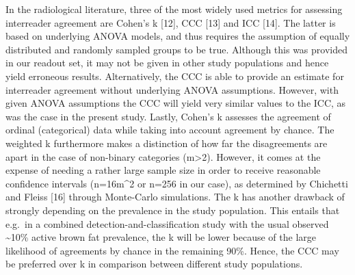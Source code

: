 \documentclass[]{elsarticle} %
\begin{document}
In the radiological literature, three of the most widely used metrics
for assessing interreader agreement are Cohen's k {[}12{]}, CCC {[}13{]}
and ICC {[}14{]}. The latter is based on underlying ANOVA models, and
thus requires the assumption of equally distributed and randomly sampled
groups to be true. Although this was provided in our readout set, it may
not be given in other study populations and hence yield erroneous
results. Alternatively, the CCC is able to provide an estimate for
interreader agreement without underlying ANOVA assumptions. However,
with given ANOVA assumptions the CCC will yield very similar values to
the ICC, as was the case in the present study. Lastly, Cohen's k
assesses the agreement of ordinal (categorical) data while taking into
account agreement by chance. The weighted k furthermore makes a
distinction of how far the disagreements are apart in the case of
non-binary categories (m\textgreater{}2). However, it comes at the
expense of needing a rather large sample size in order to receive
reasonable confidence intervals (n=16m\^{}2 or n=256 in our case), as
determined by Chichetti and Fleiss {[}16{]} through Monte-Carlo
simulations. The k has another drawback of strongly depending on the
prevalence in the study population. This entails that e.g.~in a combined
detection-and-classification study with the usual observed
\textasciitilde{}10\% active brown fat prevalence, the k will be lower
because of the large likelihood of agreements by chance in the remaining
90\%. Hence, the CCC may be preferred over k in comparison between
different study populations.
\end{document}
